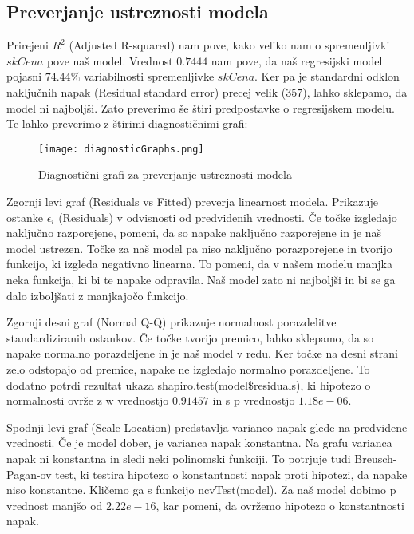 \documentclass[a4paper, 12pt]{article}
\begin{document}
\subsection{Preverjanje ustreznosti modela}

Prirejeni $ R^{2} $ (Adjusted R-squared) nam pove, kako veliko nam o
spremenljivki $ skCena $ pove naš model. Vrednost $ 0.7444 $ nam pove, da naš
regresijski model pojasni $ 74.44\% $ variabilnosti spremenljivke $ skCena $.
Ker pa je standardni odklon naključnih napak (Residual standard error) precej
velik ($ 357 $), lahko sklepamo, da model ni najboljši. Zato preverimo še štiri
predpostavke o regresijskem modelu. Te lahko preverimo z štirimi diagnostičnimi
grafi:
\begin{figure}[H]
	\centering
	\texttt{[image: diagnosticGraphs.png]}
	\caption{Diagnostični grafi za preverjanje ustreznosti modela}
	\label{figure:3}
\end{figure}

Zgornji levi graf (Residuals vs Fitted) preverja linearnost modela. Prikazuje
ostanke $ \epsilon_{i} $ (Residuals) v odvisnosti od predvidenih vrednosti. Če točke
izgledajo naključno razporejene, pomeni, da so napake naključno razporejene in
je naš model ustrezen. Točke za naš model pa niso naključno porazporejene in
tvorijo funkcijo, ki izgleda negativno linearna. To pomeni, da v našem modelu
manjka neka funkcija, ki bi te napake odpravila. Naš model zato ni najboljši in
bi se ga dalo izboljšati z manjkajočo funkcijo.

Zgornji desni graf (Normal Q-Q) prikazuje normalnost porazdelitve
standardiziranih ostankov. Če točke tvorijo premico, lahko sklepamo, da so
napake normalno porazdeljene in je naš model v redu. Ker točke na desni strani
zelo odstopajo od premice, napake ne izgledajo normalno porazdeljene. To
dodatno potrdi rezultat ukaza {\sf shapiro.test(model\$residuals)}, ki hipotezo
o normalnosti ovrže z w vrednostjo $ 0.91457 $ in s p vrednostjo $ 1.18e-06 $.

Spodnji levi graf (Scale-Location) predstavlja varianco napak glede na
predvidene vrednosti. Če je model dober, je varianca napak konstantna.
Na grafu varianca napak ni konstantna in sledi neki polinomski funkciji.
To potrjuje tudi Breusch-Pagan-ov test, ki testira hipotezo o konstantnosti
napak proti hipotezi, da napake niso konstantne. Kličemo ga s funkcijo
{\sf ncvTest(model)}. Za naš model dobimo p vrednost manjšo od $ 2.22e-16 $,
kar pomeni, da ovržemo hipotezo o konstantnosti napak.
\end{document}
